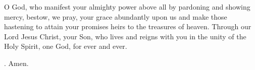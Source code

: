 \lettrine[lines=3]{O}{} God, who manifest your almighty power above all by pardoning and showing mercy, bestow, we pray, your grace abundantly upon us and make those hastening to attain your promises heirs to the treasures of heaven. Through our Lord Jesus Christ, your Son, who lives and reigns with you in the unity of the Holy Spirit, one God, for ever and ever. \par \Rbar. Amen.
